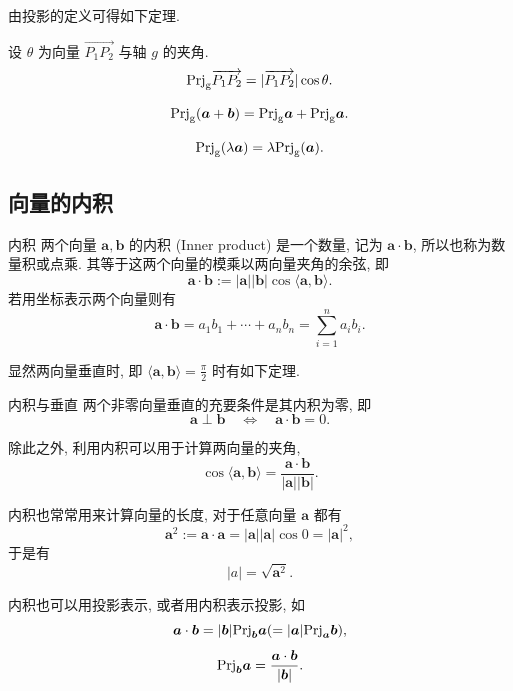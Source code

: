 \documentclass[cn,toc=twocol]{elegantbook}
\newcommand{\ve}[1]{\boldsymbol{#1}}
\newcommand{\Ve}[1]{\overrightarrow{#1}}
\begin{document}
由投影的定义可得如下定理.

\begin{theorem}
设 $\theta$ 为向量 $\Ve{P_1 P_2}$ 与轴 $g$ 的夹角.
\[
	\rm{Prj}_g\Ve{P_1 P_2} = \lvert \Ve{P_1 P_2} \rvert \cos \theta.
\]
\end{theorem}


\begin{corollary}
\[
	\rm{Prj}_g(\ve a + \ve b) = \rm{Prj}_g\ve a + \rm{Prj}_g\ve a.
\]
\end{corollary}

\begin{corollary}
\[
	\rm{Prj}_g(\lambda\ve a) = \lambda\rm{Prj}_g(\ve a).
\]
\end{corollary}


\subsection{向量的内积}

\begin{definition}{内积}
	两个向量 $\ve a, \ve b$ 的内积 (Inner product) 是一个数量, 记为 $\ve a \cdot \ve b$, 所以也称为数量积或点乘. 其等于这两个向量的模乘以两向量夹角的余弦, 即
	\[
		\ve a\cdot\ve b := \lvert \ve a \rvert \lvert \ve b \rvert \cos \langle\ve a,\ve b\rangle.
	\]
	若用坐标表示两个向量则有
	\[
	\ve a\cdot\ve b = a_1b_1+\cdots+a_nb_n=\sum_{i=1}^n a_i b_i.
	\]
\end{definition}

显然两向量垂直时, 即 $\langle\ve a,\ve b\rangle = \frac{\pi}{2}$ 时有如下定理.

\begin{theorem}{内积与垂直}{}
	两个非零向量垂直的充要条件是其内积为零, 即
	\[
		\ve a \perp \ve b \quad \iff \quad \ve a\cdot\ve b =0.
	\]
\end{theorem}

除此之外, 利用内积可以用于计算两向量的夹角,
\[
\cos \langle \ve a, \ve b \rangle = \frac{\ve a \cdot \ve b}{\lvert \ve a \rvert \lvert \ve b \rvert}.
\]

内积也常常用来计算向量的长度, 对于任意向量 $\ve a$ 都有
\[
	\ve a ^2 := \ve a \cdot \ve a = \lvert \ve a \rvert \lvert \ve a \rvert \cos 0 = \lvert \ve a \rvert ^2,
\]
于是有
\[
\lvert a \rvert = \sqrt{\ve a ^2}.
\]

内积也可以用投影表示, 或者用内积表示投影, 如
\[
	\ve a \cdot \ve b = \lvert \ve b \rvert \rm{Prj}_{\ve b} \ve a (= \lvert \ve a \rvert \rm{Prj}_{\ve a} \ve b),
\]
\[
	\rm{Prj}_{\ve b} \ve a  = \frac{\ve a \cdot \ve b}{\lvert \ve b \rvert}.
\]
\end{document}
